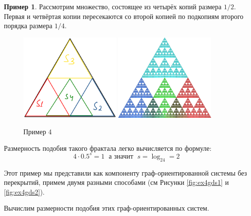 \documentclass[a4paper,14pt]{extarticle} %
\newcommand{\0}{\varnothing}
\newcommand{\8}{\infty}
\theoremstyle{definition}
\newtheorem{example}{Пример}
\begin{document}
\begin{example}\label{ex:4}
Рассмотрим множество, состоящее из четырёх копий размера $1/2$.
Первая и четвёртая копии пересекаются со второй копией по подкопиям второго порядка размера $1/4$.
\begin{figure}[H]
    \centering
    \includegraphics[width=0.45\textwidth]{e4k1.png}
    \hfill
    \includegraphics[width=0.45\textwidth]{e4k.png}
    \begin{minipage}{0.85\textwidth}
        \caption{Пример 4}
        \label{fig:ex4}   
    \end{minipage}
\end{figure}

Размерность подобия такого фрактала легко вычисляется по формуле:
$$4\cdot0.5^s=1\;\text{ а значит }\;s=\log_24=2$$

Этот пример мы представили как компоненту граф-ориентированной системы без перекрытий, примем двумя разными способами (см Рисунки \ref{fig:ex4gds1} и \ref{fig:ex4gds2}).

Вычислим размерности подобия этих граф-ориентированных систем.


\end{example}
\end{document}
